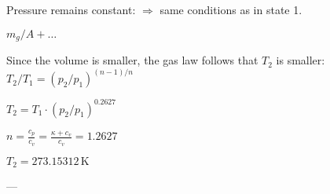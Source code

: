Pressure remains constant: \( \Rightarrow \) same conditions as in state 1.  

\( m_g / A + \dots \)  

Since the volume is smaller, the gas law follows that \( T_2 \) is smaller:  
\( T_2 / T_1 = (p_2 / p_1)^{(n-1)/n} \)  

\( T_2 = T_1 \cdot (p_2 / p_1)^{0.2627} \)  

\( n = \frac{c_p}{c_v} = \frac{\kappa + c_v}{c_v} = 1.2627 \)  

\( T_2 = 273.15312 \, \text{K} \)  

---